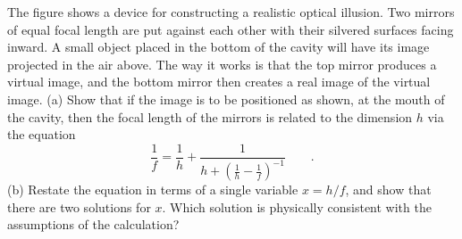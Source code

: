 The figure shows a device for constructing a realistic
optical illusion. Two mirrors of equal focal length are put
against each other with their silvered surfaces facing
inward. A small object placed in the bottom of the cavity
will have its image projected in the air above. The way it
works is that the top mirror produces a virtual image, and
the bottom mirror then creates a real image of the virtual
image. (a) Show that if the image is to be positioned as
shown, at the mouth of the cavity, then the focal length of
the mirrors is related to the dimension $h$ via the equation
\begin{equation*}
                \frac{1}{f}    = \frac{1}{h}+\frac{1}{h+\left(\frac{1}{h}-\frac{1}{f}\right)^{-1}}       \qquad   .
\end{equation*}
(b) Restate the equation in terms of a single variable
$x=h/f$, and show that there are two solutions for $x$.
Which solution is physically consistent with the assumptions of the calculation?
